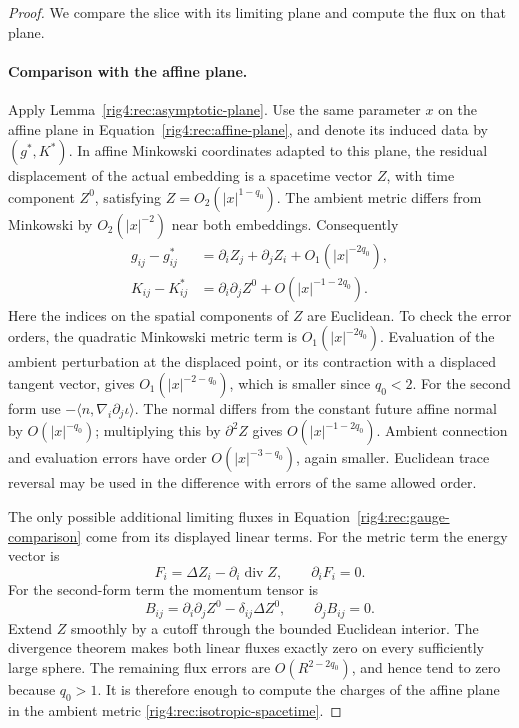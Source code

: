\begin{proof}
We compare the slice with its limiting plane and compute the flux on that plane.

\paragraph{Comparison with the affine plane.}
Apply Lemma~\ref{rig4:rec:asymptotic-plane}.  Use the same parameter $x$ on the
affine plane in Equation~\eqref{rig4:rec:affine-plane}, and denote its induced data
by $(g^*,K^*)$.  In affine Minkowski coordinates adapted to this plane, the
residual displacement of the actual embedding is a spacetime vector $Z$,
with time component $Z^0$, satisfying $Z=O_2(|x|^{1-q_0})$.  The ambient
metric differs from Minkowski by $O_2(|x|^{-2})$ near both embeddings.
Consequently
\begin{equation}
 \begin{split}
 g_{ij}-g^*_{ij}
   &=\partial_iZ_j+\partial_jZ_i+O_1(|x|^{-2q_0}),\\
 K_{ij}-K^*_{ij}
   &=\partial_i\partial_jZ^0+O(|x|^{-1-2q_0}).
 \end{split}
 \label{rig4:rec:gauge-comparison}
\end{equation}
Here the indices on the spatial components of $Z$ are Euclidean.
To check the error orders, the quadratic Minkowski metric term is
$O_1(|x|^{-2q_0})$.  Evaluation of the ambient perturbation at the displaced
point, or its contraction with a displaced tangent vector, gives
$O_1(|x|^{-2-q_0})$, which is smaller since $q_0<2$.  For the second form use
$-\langle n,\nabla_i\partial_j\iota\rangle$.  The normal differs from the
constant future affine normal by $O(|x|^{-q_0})$; multiplying this by
$\partial^2Z$ gives $O(|x|^{-1-2q_0})$.  Ambient connection and evaluation
errors have order $O(|x|^{-3-q_0})$, again smaller.  Euclidean trace reversal
may be used in the difference with errors of the same allowed order.

The only possible additional limiting fluxes in
Equation~\eqref{rig4:rec:gauge-comparison} come from its displayed linear terms.
For the metric term the energy vector is
\[
 F_i=\Delta Z_i-\partial_i\operatorname{div}Z,
 \qquad \partial_iF_i=0.
\]
For the second-form term the momentum tensor is
\[
 B_{ij}=\partial_i\partial_jZ^0-\delta_{ij}\Delta Z^0,
 \qquad \partial_jB_{ij}=0.
\]
Extend $Z$ smoothly by a cutoff through the bounded Euclidean interior.
The divergence theorem makes both linear fluxes exactly zero on every
sufficiently large sphere.  The remaining flux errors are
$O(R^{2-2q_0})$, and hence tend to zero because $q_0>1$.  It is therefore
enough to compute the charges of the affine plane in the ambient metric
\eqref{rig4:rec:isotropic-spacetime}.


\end{proof}
